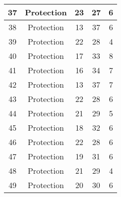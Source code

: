 \documentclass[results.tex]{subfiles}
\begin{document}
\begin{center}
\begin{tabular}{| c || c | c | c | c |}
            \hline
            37                      & Protection                   & 23                     & 27                      & 6                    \\
            \hline
            38                      & Protection                   & 13                     & 37                      & 6                    \\
            \hline
            39                      & Protection                   & 22                     & 28                      & 4                    \\
            \hline
            40                      & Protection                   & 17                     & 33                      & 8                    \\
            \hline
            41                      & Protection                   & 16                     & 34                      & 7                    \\
            \hline
            42                      & Protection                   & 13                     & 37                      & 7                    \\
            \hline
            43                      & Protection                   & 22                     & 28                      & 6                    \\
            \hline
            44                      & Protection                   & 21                     & 29                      & 5                    \\
            \hline
            45                      & Protection                   & 18                     & 32                      & 6                    \\
            \hline
            46                      & Protection                   & 22                     & 28                      & 6                    \\
            \hline
            47                      & Protection                   & 19                     & 31                      & 6                    \\
            \hline
            48                      & Protection                   & 21                     & 29                      & 4                    \\
            \hline
            49                      & Protection                   & 20                     & 30                      & 6                    \\
            \hline
        \end{tabular}
    \end{center}
\end{document}
